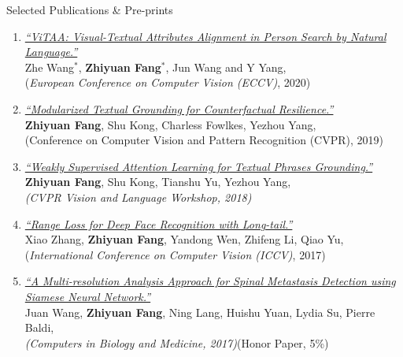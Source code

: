 \documentclass{resume} %
\begin{document}
\begin{rSection}{Selected Publications \& Pre-prints}
\begin{enumerate}
    \item \href{https://arxiv.org/abs/2005.07327}{\textit{``ViTAA: Visual-Textual Attributes Alignment in Person Search by Natural Language.''}} {\\Zhe Wang$^*$, \textbf{{Zhiyuan Fang$^*$}}, Jun Wang and Y Yang, \\({\textit{European Conference on Computer Vision (ECCV)}}, 2020)}
    
    \item \href{https://openaccess.thecvf.com/content_CVPR_2019/papers/Fang_Modularized_Textual_Grounding_for_Counterfactual_Resilience_CVPR_2019_paper.pdf}{\textit{``Modularized Textual Grounding for Counterfactual Resilience.''}}{\\\textbf{Zhiyuan Fang}, Shu Kong, Charless Fowlkes, Yezhou Yang, \\({Conference on Computer Vision and Pattern Recognition (CVPR)}, 2019)}
    
    
    \item \href{https://arxiv.org/abs/1805.00545} {\textit{``Weakly Supervised Attention Learning for Textual Phrases Grounding.''}} {\\\textbf{{Zhiyuan Fang}}, Shu Kong, Tianshu Yu, Yezhou Yang, \\\textit{({CVPR Vision and Language Workshop}, 2018)}}
    
    \item \href{https://arxiv.org/abs/1611.08976} {\textit{``Range Loss for Deep Face Recognition with Long-tail.''}}{\\Xiao Zhang, \textbf{{Zhiyuan Fang}}, Yandong Wen, Zhifeng Li, Qiao Yu, \\({\textit{International Conference on Computer Vision (ICCV)}}, 2017)}
    
    \item \href{http://www.sciencedirect.com/science/article/pii/S0010482517300793} {\textit{``A Multi-resolution Analysis Approach for Spinal Metastasis Detection using Siamese Neural Network.''}} \\{Juan Wang, \textbf{{Zhiyuan Fang}}, Ning Lang,  Huishu Yuan, Lydia Su,  Pierre Baldi, \\
    \textit{{(Computers in Biology and Medicine}, 2017)}}(Honor Paper, 5\%)

\end{enumerate}


\end{rSection}
\end{document}
